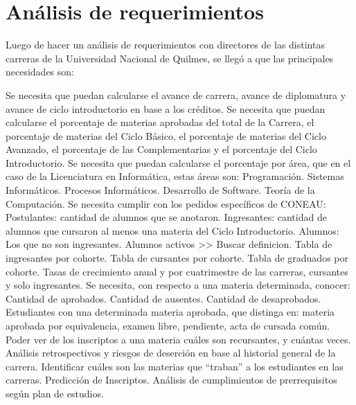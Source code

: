 \section[Análisis de requerimientos]{Análisis de requerimientos}

Luego de hacer un análisis de requerimientos con directores de las distintas carreras de la Universidad Nacional de Quilmes, se llegó a que las principales necesidades son:

\begin{outline}
    \1 Se necesita que puedan calcularse el avance de carrera, avance de diplomatura y avance de ciclo introductorio en base a los créditos.
    \1 Se necesita que puedan calcularse el porcentaje de materias aprobadas del total de la Carrera, el porcentaje de materias del Ciclo Básico, el porcentaje de materias del Ciclo Avanzado, el porcentaje de las Complementarias y el porcentaje del Ciclo Introductorio.
    \1 Se necesita que puedan calcularse el porcentaje por área, que en el caso de la Licenciatura en Informática, estas áreas son: 
        \2 Programación.
        \2 Sistemas Informáticos.
        \2 Procesos Informáticos.
        \2 Desarrollo de Software.
        \2 Teoría de la Computación.
    \1 Se necesita cumplir con los pedidos específicos de CONEAU:
        \2 Postulantes: cantidad de alumnos que se anotaron.
        \2 Ingresantes: cantidad de alumnos que cursaron al menos una materia del Ciclo Introductorio.
        \2 Alumnos: Los que no son ingresantes. Alumnos activos >> Buscar definicion.
        \2 Tabla de ingresantes por cohorte.
        \2 Tabla de cursantes por cohorte.
        \2 Tabla de graduados por cohorte.
        \2 Tasas de crecimiento anual y por cuatrimestre de las carreras, cursantes y solo ingresantes.
    \1 Se necesita, con respecto a una materia determinada, conocer:
        \2 Cantidad de aprobados.
        \2 Cantidad de ausentes.
        \2 Cantidad de desaprobados.
    \1 Estudiantes con una determinada materia aprobada, que distinga en: materia aprobada por equivalencia, examen libre, pendiente, acta de cursada común.
    \1 Poder ver de los inscriptos a una materia cuáles son recursantes, y cuántas veces.
    \1 Análisis retrospectivos y riesgos de deserción en base al historial general de la carrera.
    \1 Identificar cuáles son las materias que “traban” a los estudiantes en las carreras. 
    \1 Predicción de Inscriptos.
    \1 Análisis de cumplimientos de prerrequisitos según plan de estudios.
    
    
        
\end{outline}

